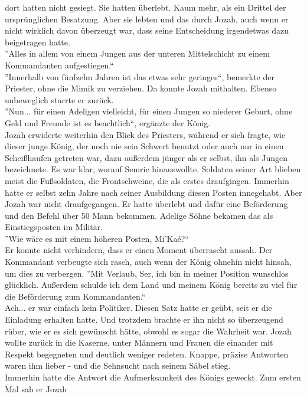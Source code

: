 dort hatten nicht gesiegt. Sie hatten überlebt. Kaum mehr, als ein Drittel der ursprünglichen 
Besatzung. Aber sie lebten und das durch Jozah, auch wenn er nicht wirklich davon überzeugt war, 
dass seine Entscheidung irgendetwas dazu beigetragen hatte.\\
''Alles in allem von einem Jungen aus der unteren Mittelschicht zu einem Kommandanten 
aufgestiegen.``\\
''Innerhalb von fünfzehn Jahren ist das etwas sehr geringes``, bemerkte der Priester, ohne die 
Mimik zu verziehen. Da konnte Jozah mithalten. Ebenso unbeweglich starrte er zurück.\\ 
''Nun... für einen Adeligen vielleicht, für einen Jungen so niederer Geburt, ohne Geld und Freunde 
ist es beachtlich``, ergänzte der König.\\
Jozah erwiderte weiterhin den Blick des Priesters, während er sich fragte, wie dieser junge König, 
der noch nie sein Schwert benutzt oder auch nur in einen Scheißhaufen getreten war, dazu außerdem 
jünger als er selbst, ihn als Jungen bezeichnete. Es war klar, worauf Semric hinauswollte. Soldaten 
seiner Art blieben meist die Fußsoldaten, die Frontschweine, die als erstes draufgingen. Immerhin 
hatte er selbst zehn Jahre nach seiner Ausbildung diesen Posten innegehabt. Aber Jozah war nicht 
draufgegangen. Er hatte überlebt und dafür eine Beförderung und den Befehl über 50 Mann bekommen. 
Adelige Söhne bekamen das als Einstiegsposten im Militär.\\
''Wie wäre es mit einem höheren Posten, Mi'Kaé?``\\
Er konnte nicht verhindern, dass er einen Moment überrascht aussah. Der Kommandant verbeugte sich 
rasch, auch wenn der König ohnehin nicht hinsah, um dies zu verbergen. ''Mit Verlaub, Ser, ich bin 
in meiner Position wunschlos glücklich. Außerdem schulde ich dem Land und meinem König bereits zu 
viel für die Beförderung zum Kommandanten.``\\
Ach... er war einfach kein Politiker. Diesen Satz hatte er geübt, seit er die Einladung erhalten 
hatte. Und trotzdem brachte er ihn nicht so überzeugend rüber, wie er es sich gewünscht hätte, 
obwohl es sogar die Wahrheit war. Jozah wollte zurück in die Kaserne, unter Männern und Frauen die 
einander mit Respekt begegneten und deutlich weniger redeten. Knappe, präzise Antworten waren ihm 
lieber - und die Sehnsucht nach seinem Säbel stieg.\\
Immerhin hatte die Antwort die Aufmerksamkeit des Königs geweckt. Zum ersten Mal sah er Jozah 
